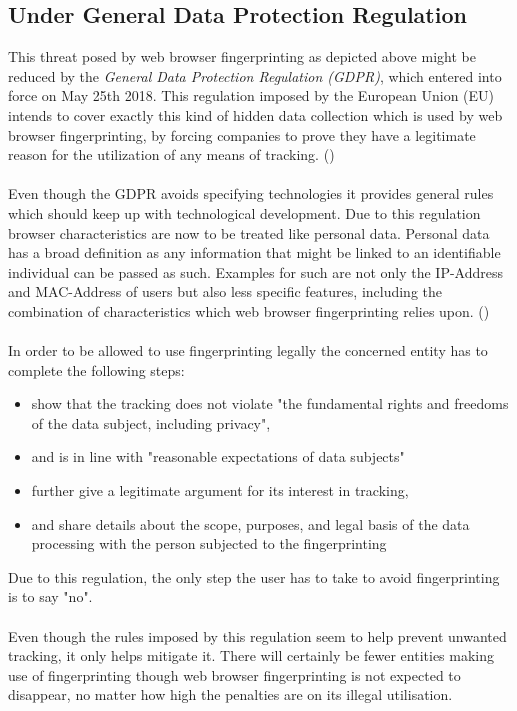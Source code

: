 \subsection{Under General Data Protection Regulation}
This threat posed by web browser fingerprinting as depicted above might be reduced by the \textit{General Data Protection Regulation (GDPR)}, which entered into force on May 25th 2018. This regulation imposed by the European Union (EU) intends to cover exactly this kind of hidden data collection which is used by web browser fingerprinting, by forcing companies to prove they have a legitimate reason for the utilization of any means of tracking. (\textcite{miele18})\\\\
Even though the GDPR avoids specifying technologies it provides general rules which should keep up with technological development. Due to this regulation browser characteristics are now to be treated like personal data. Personal data has a broad definition as any information that might be linked to an identifiable individual can be passed as such. Examples for such are not only the IP-Address and MAC-Address of users but also less specific features, including the combination of characteristics which web browser fingerprinting relies upon. (\textcite{miele18})\\\\
In order to be allowed to use fingerprinting legally the concerned entity has to complete the following steps:
\begin{itemize}
	\item show that the tracking does not violate "the fundamental rights and freedoms of the data subject, including privacy", 
	\item and is in line with "reasonable expectations of data subjects"
	\item further give a legitimate argument for its interest in tracking,
	\item and share details about the scope, purposes, and legal basis of the data processing with the person subjected to the fingerprinting
\end{itemize}
Due to this regulation, the only step the user has to take to avoid fingerprinting is to say "no".\\\\
Even though the rules imposed by this regulation seem to help prevent unwanted tracking, it only helps mitigate it. There will certainly be fewer entities making use of fingerprinting though web browser fingerprinting is not expected to disappear, no matter how high the penalties are on its illegal utilisation.\\\\
